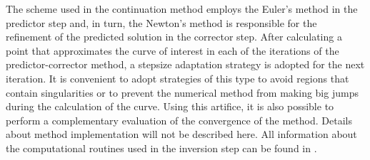 \documentclass[journal=iecred,manuscript=article]{achemso}
\theoremstyle{definition}
\theoremstyle{remark}
\begin{document}
%
The scheme used in the continuation method employs the Euler's method in the predictor step and, in turn, the Newton's method is responsible for the refinement of the predicted solution in the corrector step.
%
%
%
%
After calculating a point that approximates the curve of interest in each of the iterations of the predictor-corrector method, %
a stepsize adaptation strategy is adopted for the next iteration. It is convenient to adopt strategies of this type to avoid regions that contain singularities or to prevent the numerical method from making big jumps during the calculation of the curve. Using this artifice, it is also possible to perform a complementary evaluation of the convergence of the method. Details about method implementation will not be described here. All information about the computational routines used in the inversion step can be found in \citet{allgower}.
\end{document}

